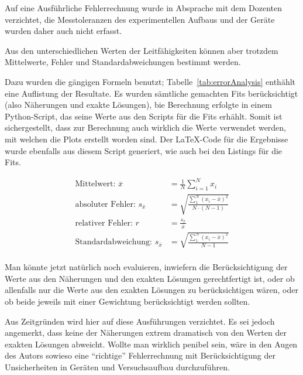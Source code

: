 Auf eine  Ausf\"uhrliche Fehlerrechnung  wurde in  Absprache mit  dem Dozenten
verzichtet, die  Messtoleranzen des  experimentellen Aufbaus und  der Ger\"ate
wurden daher auch nicht erfasst.

Aus den unterschiedlichen Werten  der Leitf\"ahigkeiten k\"onnen aber trotzdem
Mittelwerte, Fehler und Standardabweichungen bestimmt werden.

Dazu  wurden die  g\"angigen Formeln  benutzt; Tabelle~\ref{tab:errorAnalysis}
enth\"ahlt eine Auflistung der Resultate. Es wurden s\"amtliche gemachten Fits
ber\"ucksichtigt  (also N\"aherungen  und exakte  L\"osungen), bie  Berechnung
erfolgte in  einem Python-Script, das  seine Werte  aus den Scripts  f\"ur die
Fits erh\"ahlt. Somit  ist sichergestellt,  dass zur Berechnung  auch wirklich
die Werte  verwendet werden, mit  welchen die Plots erstellt  worden sind. Der
\LaTeX-Code f\"ur die Ergebnisse wurde  ebenfalls aus diesem Script generiert,
wie auch bei den Listings f\"ur die Fits.

\begin{align*}
    \text{Mittelwert:~}             \overline{x} & = \frac{1}{N} \sum_{i=1}^{N}{x_i} \\
    \text{absoluter Fehler:~}   s_{\overline{x}} & = \sqrt{ \frac{\sum_{1}^{N}{(x_i-\overline{x})^2}}{N \cdot (N-1)}} \\
    \text{relativer Fehler:~}   r                & = \frac{s_{\overline{x}}}{\overline{x}} \\
    \text{Standardabweichung:~} s_{\overline{x}} & = \sqrt{ \frac{\sum_{1}^{N}{(x_i-\overline{x})^2}}{N-1}} \\
\end{align*}



Man   k\"onnte    jetzt   nat\"urlich    noch   evaluieren,    inwiefern   die
Ber\"ucksichtigung der Werte  aus den N\"aherungen und  den exakten L\"osungen
gerechtfertigt  ist,  oder  ob  allenfalls  nur  die  Werte  aus  den  exakten
L\"osungen  zu ber\"ucksichtigen  w\"aren,  oder ob  beide  jeweils mit  einer
Gewichtung  ber\"ucksichtigt  werden   sollten.

Aus  Zeitgr\"unden  wird  hier  auf diese  Ausf\"uhrungen  verzichtet. Es  sei
jedoch  angemerkt,  dass keine  der  N\"aherungen  extrem dramatisch  von  den
Werten  der exakten  L\"osungen  abweicht. Wollte man  wirklich penibel  sein,
w\"are  in  den Augen  des  Autors  sowieso eine  ``richtige''  Fehlerrechnung
mit  Ber\"ucksichtigung der  Unsicherheiten  in  Ger\"aten und  Versuchsaufbau
durchzuf\"uhren.

